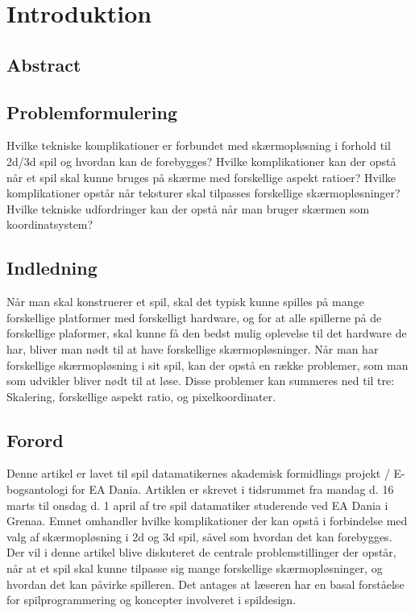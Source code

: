 \documentclass[Main.tex]{introduktion}
\begin{document}
\chapter{Introduktion}

				
\section{Abstract}

\section{Problemformulering}
Hvilke tekniske komplikationer er forbundet med skærmopløsning i forhold til 2d/3d spil og hvordan kan de forebygges?
Hvilke komplikationer kan der opstå når et spil skal kunne bruges på skærme med forskellige aspekt ratioer?
Hvilke komplikationer opstår når teksturer skal tilpasses forskellige skærmopløsninger?
Hvilke tekniske udfordringer kan der opstå når man bruger skærmen som koordinatsystem?
		
\section{Indledning}

Når man skal konstruerer et spil, skal det typisk kunne spilles på mange forskellige platformer med forskelligt hardware, og for at alle spillerne på de forskellige plaformer, skal kunne få den bedst mulig oplevelse til det hardware de har, bliver man nødt til at have forskellige skærmopløsninger. 
Når man har forskellige skærmopløsning i sit spil, kan der opstå en række problemer, som man som udvikler bliver nødt til at løse. Disse problemer kan summeres ned til tre: Skalering, forskellige aspekt ratio, og pixelkoordinater.		
	
		
\section{Forord}
Denne artikel er lavet til spil datamatikernes akademisk formidlings projekt / E-bogsantologi for EA Dania. Artiklen er skrevet i tidsrummet fra mandag d. 16 marts til onsdag d. 1 april af tre spil datamatiker studerende ved EA Dania i Grenaa.
Emnet omhandler hvilke komplikationer der kan opstå i forbindelse med valg af skærmopløsning i 2d og 3d spil, såvel som hvordan det kan forebygges. Der vil i denne artikel blive diskuteret de centrale problemstillinger der opstår, når at et spil skal kunne tilpasse sig mange forskellige skærmopløsninger, og hvordan det kan påvirke spilleren. 
Det antages at læseren har en basal forståelse for spilprogrammering og koncepter involveret i spildesign.
\end{document}
